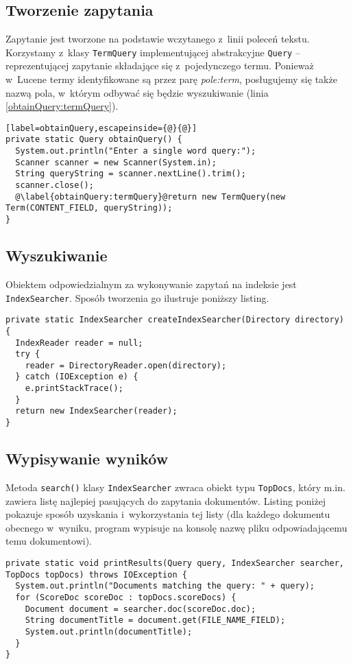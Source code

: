 \subsection{Tworzenie zapytania}

Zapytanie jest tworzone na podstawie wczytanego z~linii poleceń tekstu. Korzystamy z~klasy \texttt{TermQuery} implementującej abstrakcyjne \texttt{Query} -- reprezentującej zapytanie składające się z~pojedynczego termu. Ponieważ w~Lucene termy identyfikowane są przez parę \emph{pole:term}, posługujemy się także nazwą pola, w~którym odbywać się będzie wyszukiwanie (linia \ref{obtainQuery:termQuery}).

\begin{lstlisting}[label=obtainQuery,escapeinside={@}{@}]
private static Query obtainQuery() {
  System.out.println("Enter a single word query:");
  Scanner scanner = new Scanner(System.in);
  String queryString = scanner.nextLine().trim();
  scanner.close();
  @\label{obtainQuery:termQuery}@return new TermQuery(new Term(CONTENT_FIELD, queryString));
}
\end{lstlisting}

\subsection{Wyszukiwanie}

Obiektem odpowiedzialnym za wykonywanie zapytań na indeksie jest \\ \texttt{IndexSearcher}. Sposób tworzenia go ilustruje poniższy listing.

\begin{lstlisting}
private static IndexSearcher createIndexSearcher(Directory directory) {
  IndexReader reader = null;
  try {
    reader = DirectoryReader.open(directory);
  } catch (IOException e) {
    e.printStackTrace();
  }
  return new IndexSearcher(reader);
}
\end{lstlisting}

\subsection{Wypisywanie wyników}

Metoda \texttt{search()} klasy \texttt{IndexSearcher} zwraca obiekt typu \texttt{TopDocs}, który m.in. zawiera listę najlepiej pasujących do zapytania dokumentów. Listing poniżej pokazuje sposób uzyskania i~wykorzystania tej listy (dla każdego dokumentu obecnego w~wyniku, program wypisuje na konsolę nazwę pliku odpowiadającemu temu dokumentowi).

\begin{lstlisting}
private static void printResults(Query query, IndexSearcher searcher, TopDocs topDocs) throws IOException {
  System.out.println("Documents matching the query: " + query);
  for (ScoreDoc scoreDoc : topDocs.scoreDocs) {
    Document document = searcher.doc(scoreDoc.doc);
    String documentTitle = document.get(FILE_NAME_FIELD);
    System.out.println(documentTitle);
  }
}
\end{lstlisting}
